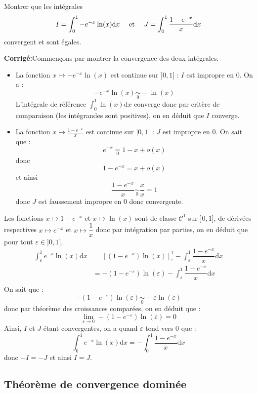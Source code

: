 \documentclass[a4paper,twoside,french,10pt]{VcCours}
\newcommand{\dx}{\text{d}x}
\newcommand{\corr}{\textbf{Corrigé:}}
\begin{document}
\begin{Exercice}{} Montrer que les intégrales 
$$ I=\int_{0}^1 -e^{-x} \ln(x) \dx \quad \hbox{ et } \quad J= \int_{0}^1 \frac{1-e^{-x}}{x} \dx$$
convergent et sont égales.
\end{Exercice}

\corr Commençons par montrer la convergence des deux intégrales.

\begin{itemize}
\item La fonction $x \mapsto -e^{-x} \ln(x)$ est continue sur $]0,1]$ : $I$ est impropre en $0$. On a :
$$  -e^{-x} \ln(x) \underset{0}{\sim} -\ln(x)$$
L'intégrale de référence $\int_0^1 \ln(x) \dx$ converge donc par critère de comparaison (les intégrandes sont positives), on en déduit que $I$ converge.
\item La fonction $x \mapsto \frac{1-e^{-x}}{x}$ est continue sur $]0,1]$ : $J$ est impropre en $0$. On sait que :
$$ e^{-x} \underset{0}{=} 1-x + o(x) $$
donc 
$$ 1-e^{-x} = x + o(x)$$
et ainsi 
$$ \frac{1-e^{-x}}{x} \underset{0}{\sim} \dfrac{x}{x}= 1$$
donc $J$ est faussement impropre en $0$ donc convergente.
\end{itemize}
 Les fonctions $x \mapsto 1-e^{-x}$ et $x \mapsto \ln(x)$ sont de classe $\mathcal{C}^1$ sur $]0,1]$, de dérivées respectives $x \mapsto e^{-x}$ et $x \mapsto \dfrac{1}{x}$ donc par intégration par parties, on en déduit que pour tout $\varepsilon \in ]0,1]$,
\begin{align*}
\int_{\varepsilon}^1 e^{-x} \ln(x) \dx & = \left[(1-e^{-x}) \ln(x) \right]_{\varepsilon}^1  - \int_{\varepsilon}^1 \dfrac{1-e^{-x}}{x} \dx \\
& = - (1-e^{-\varepsilon}) \ln(\varepsilon)  - \int_{\varepsilon}^1 \dfrac{1-e^{-x}}{x} \dx \\
\end{align*}
On sait que :
$$ - (1-e^{-\varepsilon}) \ln(\varepsilon) \underset{0}{\sim} - \varepsilon \ln(\varepsilon)$$
donc par théorème des croissances comparées, on en déduit que :
$$ \lim_{\varepsilon \rightarrow 0}  - (1-e^{-\varepsilon}) \ln(\varepsilon) = 0$$
Ainsi, $I$ et $J$ étant convergentes, on a quand $\varepsilon$ tend vers $0$ que :
$$ \int_{0}^1 e^{-x} \ln(x) \dx =  - \int_{0}^1 \dfrac{1-e^{-x}}{x} \dx $$
donc $-I=-J$ et ainsi $I=J$.



\medskip


\subsection{Théorème de convergence dominée}
\end{document}
